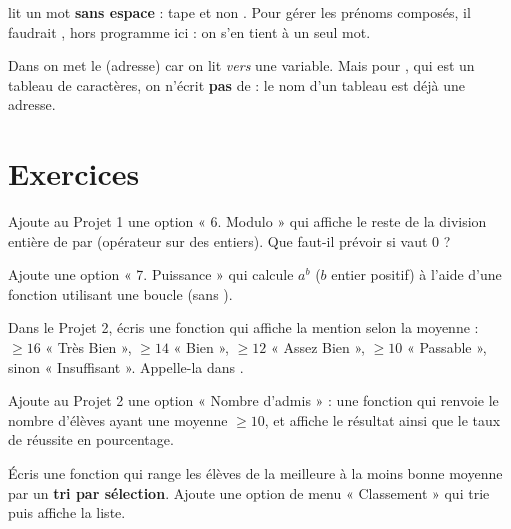 
\begin{attention}
 lit un mot \textbf{sans espace} : tape
 et non . Pour gérer les prénoms composés, il faudrait
, hors programme ici : on s'en tient à un seul mot.
\end{attention}

\begin{remarque}
Dans  on met le \code{\&} (adresse) car on
lit \emph{vers} une variable. Mais pour , qui est un tableau
de caractères, on n'écrit \textbf{pas} de \code{\&} : le nom d'un tableau est déjà
une adresse.
\end{remarque}

\section{Exercices}


Ajoute au Projet 1 une option « 6. Modulo » qui affiche le reste de la division
entière de  par  (opérateur \code{\%} sur des entiers). Que faut-il
prévoir si  vaut 0 ?

Ajoute une option « 7. Puissance » qui calcule $a^b$ ($b$ entier positif) à l'aide
d'une fonction  utilisant une boucle (sans
).

Dans le Projet 2, écris une fonction  qui affiche la mention
selon la moyenne : $\geq 16$ « Très Bien », $\geq 14$ « Bien », $\geq 12$
« Assez Bien », $\geq 10$ « Passable », sinon « Insuffisant ». Appelle-la dans
.

Ajoute au Projet 2 une option « Nombre d'admis » : une fonction 
qui renvoie le nombre d'élèves ayant une moyenne $\geq 10$, et affiche le résultat
ainsi que le taux de réussite en pourcentage.


Écris une fonction  qui range les élèves
de la meilleure à la moins bonne moyenne par un \textbf{tri par sélection}. Ajoute
une option de menu « Classement » qui trie puis affiche la liste.

